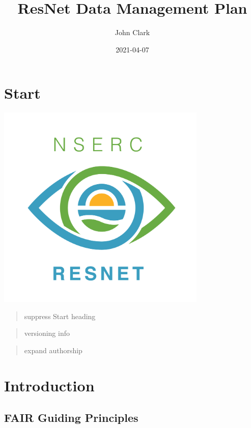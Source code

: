 \documentclass[
]{book}
\title{ResNet Data Management Plan}
\author{John Clark}
\date{2021-04-07}
\begin{document}
\maketitle

{
\setcounter{tocdepth}{1}
\tableofcontents
}
\hypertarget{start}{%
\chapter*{Start}\label{start}}

\includegraphics[width=0.75\textwidth,height=\textheight]{static/ResNet-logo.png}

\begin{quote}
suppress Start heading
\end{quote}

\begin{quote}
versioning info
\end{quote}

\begin{quote}
expand authorship
\end{quote}

\hypertarget{introduction}{%
\chapter{Introduction}\label{introduction}}

\hypertarget{fair-guiding-principles}{%
\section{FAIR Guiding Principles}\label{fair-guiding-principles}}
\end{document}
